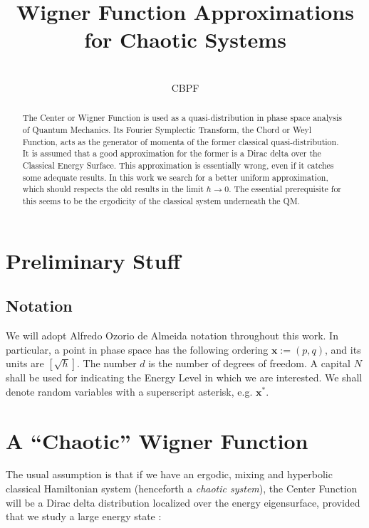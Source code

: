 \documentclass[a4paper,12pt]{article}
\title{ Wigner Function Approximations for Chaotic Systems}
\author{\\CBPF}
\newcommand{\xfase}{\mathbf{x}}
\begin{document}
\maketitle

\begin{abstract}


The Center or Wigner Function is used as a quasi-distribution in 
phase space analysis
of Quantum Mechanics. Its Fourier Symplectic Transform, 
the Chord or Weyl Function, 
acts as the generator of momenta of the former 
classical quasi-distribution. It is
assumed that a good approximation for the former is a Dirac delta over
the Classical Energy Surface. This approximation is essentially wrong,
even if it catches some adequate results.
In this work we search for a better uniform approximation, which
should respects the old results in the limit $\hbar\rightarrow 0$.
The essential prerequisite for this seems to be the ergodicity of
the classical system underneath the QM.

\end{abstract}

\section{Preliminary Stuff}

\subsection{Notation}

We will adopt Alfredo Ozorio de Almeida notation throughout this work. 
In particular, a point in phase space has the 
following ordering  $\xfase:=(p,q)$, and its units are $[\sqrt{\hbar}]$.
The number $d$ is the number of degrees of freedom. A capital $N$ shall
be used for indicating the Energy Level in which we are interested.
We shall denote random  variables with a superscript asterisk, e.g.
$\xfase^*$.

\section{A ``Chaotic'' Wigner Function}

The usual assumption is that if we have an ergodic, mixing and hyperbolic
classical Hamiltonian system (henceforth a \emph{chaotic system}), the
Center Function will be a Dirac delta distribution localized over the
energy eigensurface, provided that we study  a large 
energy state \cite{Voros76}:
\end{document}

